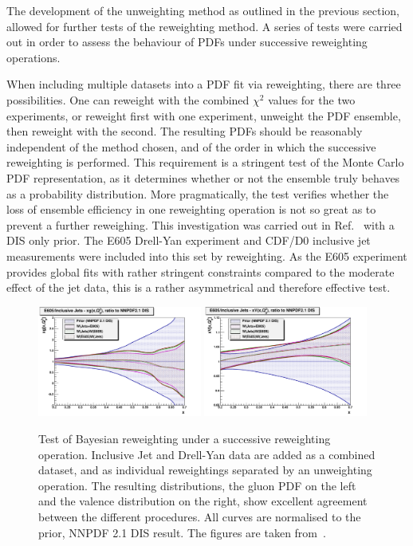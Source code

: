 The development of the unweighting method as outlined in the previous section, allowed for further tests of the reweighting method. A series of tests were carried out in order to assess the behaviour of PDFs under successive reweighting operations.

When including multiple datasets into a PDF fit via reweighting, there are three possibilities. One can reweight with the combined $\chi^2$ values for the two experiments, or reweight first with one experiment, unweight the PDF ensemble, then reweight with the second. The resulting PDFs should be reasonably independent of the method chosen, and of the order in which the successive reweighting is performed. This requirement is a stringent test of the Monte Carlo PDF representation, as it determines whether or not the ensemble truly behaves as a probability distribution. More pragmatically, the test verifies whether the loss of ensemble efficiency in one reweighting operation is not so great as to prevent a further reweighing. This investigation was carried out in Ref.~\cite{Ball:2011gg} with a DIS only prior. The E605 Drell-Yan experiment and CDF/D0 inclusive jet measurements were included into this set by reweighting. As the E605 experiment provides global fits with rather stringent constraints compared to the moderate effect of the jet data, this is a rather asymmetrical and therefore effective test.



\begin{figure}[ht]
\centering
\includegraphics[width=0.48\textwidth]{4-LHCtools/figs/e605-jets_xg_lin_zoom_rel.pdf}
\includegraphics[width=0.48\textwidth]{4-LHCtools/figs/e605-jets_xV_lin_zoom_rel.pdf}
\caption[Test of Bayesian reweighting under a successive reweighting operation]{Test of Bayesian reweighting under a successive reweighting operation. Inclusive Jet and Drell-Yan data are added as a combined dataset, and as individual reweightings separated by an unweighting operation. The resulting distributions, the gluon PDF on the left and the valence distribution on the right, show excellent agreement between the different procedures. All curves are normalised to the prior, NNPDF 2.1 DIS result. The figures are taken from~\cite{Ball:2011gg}.}
\label{fig:SRWvalid}
\end{figure}

